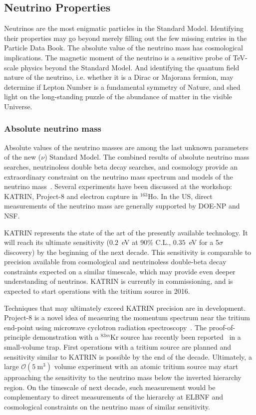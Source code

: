 \subsection{Neutrino Properties}
\label{sec:Properties}

Neutrinos are the most enigmatic particles in the Standard
Model. Identifying their properties may go beyond merely filling out
the few missing entries in the Particle Data Book. The absolute value
of the neutrino mass has cosmological implications. The magnetic
moment of the neutrino is a sensitive probe of TeV-scale physics
beyond the Standard Model. And identifying the quantum field nature of
the neutrino, i.e. whether it is a Dirac or Majorana fermion, may
determine if Lepton Number is a fundamental symmetry of Nature, and
shed light on the long-standing puzzle of the abundance of matter in
the visible Universe.

\subsubsection{Absolute neutrino mass}

Absolute values of the neutrino masses are among the last unknown
parameters of the new ($\nu$) Standard Model.  The combined results of
absolute neutrino mass searches, neutrinoless double beta decay
searches, and cosmology provide an extraordinary constraint on the
neutrino mass spectrum and models of the neutrino
mass~\cite{Bahcall:2004ip}.  Several experiments have been discussed
at the workshop: KATRIN, Project-8 and electron capture in
$^{163}$Ho. In the US, direct measurements of the neutrino mass are
generally supported by DOE-NP and NSF.

KATRIN represents the state of the art of the presently available
technology. It will reach its ultimate sensitivity ($0.2$~eV at 90\%
C.L., $0.35$~eV for a 5$\sigma$ discovery) by the beginning of the
next decade. This sensitivity is comparable to precision available
from cosmological and neutrinoless double-beta decay constraints
expected on a similar timescale, which may provide even deeper
understanding of neutrinos. KATRIN is currently in commissioning, and is expected
to start operations with the tritium source in 2016.

Techniques that may ultimately exceed KATRIN precision are in
development. Project-8 is a novel idea of measuring the momentum
spectrum near the tritium end-point using microwave cyclotron
radiation spectroscopy~\cite{Monreal:2009za}. The proof-of-principle
demonstration with a $^{83m}$Kr source has recently been
reported~\cite{Asner:2014cwa} in a small-volume trap. First operations
with a tritium source are planned and sensitivity similar to KATRIN is
possible by the end of the decade. Ultimately, a large
$\mathcal{O}(5~\mathrm{m}^3)$ volume experiment with an atomic tritium
source may start approaching the sensitivity to the neutrino mass
below the inverted hierarchy region. On the timescale of next decade,
such measurement would be complementary to direct measurements of the
hierarchy at ELBNF and cosmological constraints on the neutrino mass
of similar sensitivity.

